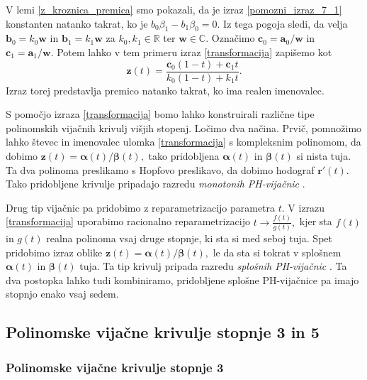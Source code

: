 \documentclass[12pt,a4paper,twoside]{article}
\theoremstyle{definition} %
\theoremstyle{plain} %
\theoremstyle{primerstyle}
\numberwithin{equation}{section}  %
\newcommand{\R}{\mathbb R}
\renewcommand{\C}{\mathbb C}
\newcommand{\aV}{\mathbf{a}}
\newcommand{\bV}{\mathbf{b}}
\newcommand{\cV}{\mathbf{c}}
\newcommand{\rV}{\mathbf{r}}
\newcommand{\wV}{\mathbf{w}}
\newcommand{\zV}{\mathbf{z}}
\newcommand{\balpha}{\boldsymbol \alpha}
\newcommand{\bbeta}{\boldsymbol \beta}
\begin{document}
V lemi \ref{z_kroznica_premica} smo pokazali, da je izraz \eqref{pomozni_izraz_7_1} konstanten natanko takrat, ko je $b_0\beta_1-b_1\beta_0=0.$ Iz tega pogoja sledi, da velja $\bV_0=k_0\wV$ in $\bV_1=k_1\wV$ za $k_0,k_1\in\R$ ter $\wV\in\C.$ Označimo $\cV_0=\aV_0/\wV$ in $\cV_1=\aV_1/\wV.$ Potem lahko v tem primeru izraz \eqref{transformacija} zapišemo kot
\begin{equation*}
	\zV(t)=\frac{\cV_0(1-t)+\cV_1t}{k_0(1-t)+k_1t}.
\end{equation*}
Izraz torej predstavlja premico natanko takrat, ko ima realen imenovalec.

S pomočjo izraza \eqref{transformacija} bomo lahko konstruirali različne tipe polinomskih vijačnih krivulj višjih stopenj. Ločimo dva načina. Prvič, pomnožimo lahko števec in imenovalec ulomka \eqref{transformacija} s kompleksnim polinomom, da dobimo $\zV(t)=\balpha(t)/\bbeta(t),$ tako pridobljena $\balpha(t)$ in $\bbeta(t)$ si nista tuja. Ta dva polinoma preslikamo s Hopfovo preslikavo, da dobimo hodograf $\rV'(t).$ %
Tako pridobljene krivulje pripadajo razredu \emph{monotonih PH-vijačnic} \cite[str.\ 371]{faroukietal2004}.

Drug tip vijačnic pa pridobimo z reparametrizacijo parametra $t.$ V izrazu \eqref{transformacija} uporabimo racionalno reparametrizacijo $t\to\frac{f(t)}{g(t)},$ kjer sta $f(t)$ in $g(t)$ realna polinoma vsaj druge stopnje, ki sta si med seboj tuja. Spet pridobimo izraz oblike $\zV(t)=\balpha(t)/\bbeta(t),$ le da sta si tokrat v splošnem $\balpha(t)$ in $\bbeta(t)$ tuja. %
Ta tip krivulj pripada razredu \emph{splošnih PH-vijačnic} \cite[str.\ 377]{faroukietal2004}. Ta dva postopka lahko tudi kombiniramo, pridobljene splošne PH-vijačnice pa imajo stopnjo enako vsaj sedem.

\subsection{Polinomske vijačne krivulje stopnje 3 in 5}

\subsubsection{Polinomske vijačne krivulje stopnje 3}
\end{document}
